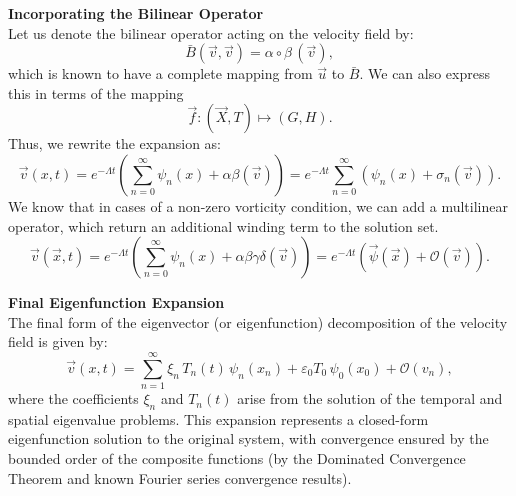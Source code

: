 \documentclass[12pt]{article}
\begin{document}
\bigskip

\textbf{Incorporating the Bilinear Operator}\\[1mm]
Let us denote the bilinear operator acting on the velocity field by:
\[
\bar{B}(\vec{v}, \vec{v}) = \alpha \circ \beta \,(\vec{v}),
\]
which is known to have a complete mapping from \(\vec{u}\) to \(\bar{B}\). We can also express this in terms of the mapping
\[
\vec{f} : (\vec{X},T) \mapsto (G, H).
\]
Thus, we rewrite the expansion as:
\[
\vec{v}(x,t) = e^{-\Lambda t} \left( \sum_{n=0}^{\infty} \psi_{n}(x) + \alpha\beta(\vec{v}) \right)
= e^{-\Lambda t} \sum_{n=0}^{\infty} \left( \psi_{n}(x) + \sigma_{n}(\vec{v}) \right).
\]
We know that in cases of a non-zero vorticity condition, we can add a multilinear operator, which return an additional winding term to the solution set.
\[
\vec{v}(\vec x,t) = e^{-\Lambda t} \left( \sum_{n=0}^{\infty} \psi_{n}(x) + \alpha\beta \gamma \delta (\vec{v}) \right)
= e^{-\Lambda t} \left( \vec \psi(\vec x) + \mathcal{O}(\vec{v}) \right).
\]

\bigskip

\textbf{Final Eigenfunction Expansion}\\[1mm]
The final form of the eigenvector (or eigenfunction) decomposition of the velocity field is given by:
\[
\vec{v}(x,t) = \sum_{n=1}^{\infty} \xi_{n} \, T_{n}(t) \, \psi_{n}(x_{n}) + \varepsilon_{0} T_{0}\,\psi_{0}(x_{0}) + \mathcal{O} (v_{n}),
\]
where the coefficients \(\xi_n\) and \(T_{n}(t)\) arise from the solution of the temporal and spatial eigenvalue problems. This expansion represents a closed-form eigenfunction solution to the original system, with convergence ensured by the bounded order of the composite functions (by the Dominated Convergence Theorem and known Fourier series convergence results).

\bigskip
\end{document}

